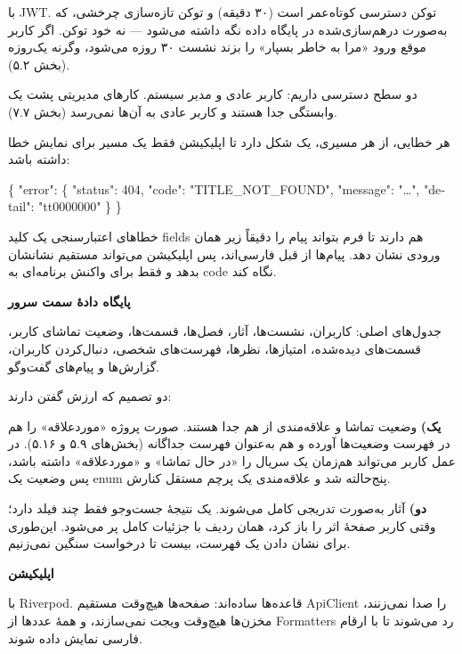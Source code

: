 \documentclass[12pt]{article}
\newcommand{\en}[1]{\textenglish{#1}}
\newcommand{\heading}[1]{%
  \par
  \vskip 0pt plus 7\baselineskip\penalty -100\vskip 0pt plus -7\baselineskip
  \vspace{1.2em}%
  {\Large\bfseries #1}%
  \par\vspace{0.6em}%
  \nobreak
}
\newcommand{\sub}[1]{%
  \par\vspace{0.8em}{\large\bfseries #1}\par\vspace{0.35em}\nobreak
}
\newcommand{\p}[1]{\textbf{#1}\hspace{0.35em}}
\begin{document}
\sub{احراز هویت}

با \en{JWT}. توکن دسترسی کوتاه‌عمر است (۳۰ دقیقه) و توکن تازه‌سازی چرخشی، که به‌صورت
درهم‌سازی‌شده در پایگاه داده نگه داشته می‌شود — نه خود توکن. اگر کاربر موقع ورود «مرا به خاطر
بسپار» را بزند نشست ۳۰ روزه می‌شود، وگرنه یک‌روزه (بخش \textenglish{۵.۲}).

دو سطح دسترسی داریم: کاربر عادی و مدیر سیستم. کارهای مدیریتی پشت یک وابستگی جدا هستند و کاربر
عادی به آن‌ها نمی‌رسد (بخش \textenglish{۷.۷}).

\sub{قالب خطا}

هر خطایی، از هر مسیری، یک شکل دارد تا اپلیکیشن فقط یک مسیر برای نمایش خطا داشته باشد:

\begin{center}
\begin{minipage}{0.9\textwidth}
\begin{english}
\ttfamily\small
\{ "error": \{ "status": 404, "code": "TITLE\_NOT\_FOUND", "message": "…", "detail": "tt0000000" \} \}
\end{english}
\end{minipage}
\end{center}

خطاهای اعتبارسنجی یک کلید \en{fields} هم دارند تا فرم بتواند پیام را دقیقاً زیر همان ورودی نشان
دهد. پیام‌ها از قبل فارسی‌اند، پس اپلیکیشن می‌تواند مستقیم نشانشان بدهد و فقط برای واکنش برنامه‌ای
به \en{code} نگاه کند.

\heading{پایگاه دادهٔ سمت سرور}

جدول‌های اصلی: کاربران، نشست‌ها، آثار، فصل‌ها، قسمت‌ها، وضعیت تماشای کاربر، قسمت‌های دیده‌شده،
امتیازها، نظرها، فهرست‌های شخصی، دنبال‌کردن کاربران، گزارش‌ها و پیام‌های گفت‌وگو.

دو تصمیم که ارزش گفتن دارند:

\p{یک)} وضعیت تماشا و علاقه‌مندی از هم جدا هستند. صورت پروژه «موردعلاقه» را هم در فهرست
وضعیت‌ها آورده و هم به‌عنوان فهرست جداگانه (بخش‌های \textenglish{۵.۹} و \textenglish{۵.۱۶}). در عمل کاربر می‌تواند
هم‌زمان یک سریال را «در حال تماشا» و «موردعلاقه» داشته باشد، پس وضعیت یک \en{enum} پنج‌حالته
شد و علاقه‌مندی یک پرچم مستقل کنارش.

\p{دو)} آثار به‌صورت تدریجی کامل می‌شوند. یک نتیجهٔ جست‌وجو فقط چند فیلد دارد؛ وقتی کاربر
صفحهٔ اثر را باز کرد، همان ردیف با جزئیات کامل پر می‌شود. این‌طوری برای نشان دادن یک فهرست،
بیست تا درخواست سنگین نمی‌زنیم.

\heading{اپلیکیشن}

\sub{مدیریت حالت}

با \en{Riverpod}. قاعده‌ها ساده‌اند: صفحه‌ها هیچ‌وقت مستقیم \en{ApiClient} را صدا نمی‌زنند،
مخزن‌ها هیچ‌وقت ویجت نمی‌سازند، و همهٔ عددها از \en{Formatters} رد می‌شوند تا با ارقام فارسی
نمایش داده شوند.
\end{document}

